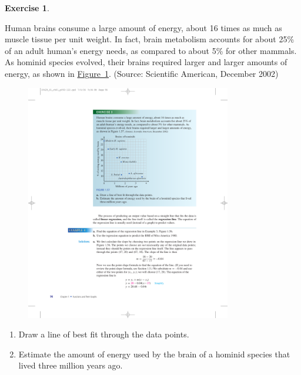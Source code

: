\documentclass[10pt,]{book}
\theoremstyle{plain}
\theoremstyle{definition}
\theoremstyle{definition}
\theoremstyle{definition}
\theoremstyle{definition}
\theoremstyle{definition}
\newtheorem{exercise}[theorem]{Exercise}
\numberwithin{equation}{section}
\begin{document}
\begin{exercise}\label{hominid-brains}

    Human brains consume a large amount of energy, about 16 times as much as muscle tissue per unit weight. In fact, brain metabolism accounts for about 25\% of an adult human’s energy needs, as compared to about 5\% for other mammals. As hominid species evolved, their brains required larger and larger amounts of energy, as shown in \hyperref[fig-hominid-brains]{Figure~\ref{fig-hominid-brains}}. (Source: Scientific American, December 2002)
\leavevmode%
\begin{figure}
\centering
\includegraphics[width=0.80\textwidth,]{images/fig-hominid-brains.pdf}\caption{\label{fig-hominid-brains}}
\end{figure}
\leavevmode%
\begin{enumerate}[label=*\alph**]
\item\hypertarget{li-197}{}Draw a line of best fit through the data points.\item\hypertarget{li-198}{}Estimate the amount of energy used by the brain of a hominid species that lived three million years ago.\end{enumerate}
\end{exercise}
\par
\end{document}
